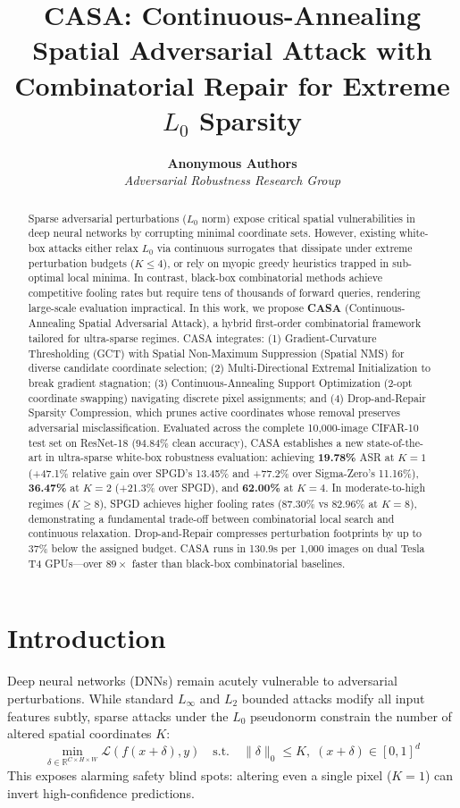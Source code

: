 \documentclass[10pt,twocolumn,letterpaper]{article}
\title{\textbf{\Large CASA: Continuous-Annealing Spatial Adversarial Attack with Combinatorial Repair for Extreme $L_0$ Sparsity}}
\author{
  \textbf{Anonymous Authors} \\
  \textit{Adversarial Robustness Research Group}
}
\date{}
\begin{document}
\maketitle

\begin{abstract}
Sparse adversarial perturbations ($L_0$ norm) expose critical spatial vulnerabilities in deep neural networks by corrupting minimal coordinate sets. However, existing white-box attacks either relax $L_0$ via continuous surrogates that dissipate under extreme perturbation budgets ($K \le 4$), or rely on myopic greedy heuristics trapped in sub-optimal local minima. In contrast, black-box combinatorial methods achieve competitive fooling rates but require tens of thousands of forward queries, rendering large-scale evaluation impractical.
In this work, we propose \textbf{CASA} (Continuous-Annealing Spatial Adversarial Attack), a hybrid first-order combinatorial framework tailored for ultra-sparse regimes. CASA integrates: (1) Gradient-Curvature Thresholding (GCT) with Spatial Non-Maximum Suppression (Spatial NMS) for diverse candidate coordinate selection; (2) Multi-Directional Extremal Initialization to break gradient stagnation; (3) Continuous-Annealing Support Optimization (2-opt coordinate swapping) navigating discrete pixel assignments; and (4) Drop-and-Repair Sparsity Compression, which prunes active coordinates whose removal preserves adversarial misclassification.
Evaluated across the complete 10,000-image CIFAR-10 test set on ResNet-18 ($94.84\%$ clean accuracy), CASA establishes a new state-of-the-art in ultra-sparse white-box robustness evaluation: achieving \textbf{19.78\%} ASR at $K=1$ (+47.1\% relative gain over SPGD's 13.45\% and +77.2\% over Sigma-Zero's 11.16\%), \textbf{36.47\%} at $K=2$ (+21.3\% over SPGD), and \textbf{62.00\%} at $K=4$. In moderate-to-high regimes ($K \ge 8$), SPGD achieves higher fooling rates ($87.30\%$ vs $82.96\%$ at $K=8$), demonstrating a fundamental trade-off between combinatorial local search and continuous relaxation. Drop-and-Repair compresses perturbation footprints by up to 37\% below the assigned budget. CASA runs in 130.9s per 1,000 images on dual Tesla T4 GPUs---over $89\times$ faster than black-box combinatorial baselines.
\end{abstract}

\section{Introduction}
Deep neural networks (DNNs) remain acutely vulnerable to adversarial perturbations. While standard $L_\infty$ and $L_2$ bounded attacks modify all input features subtly, sparse attacks under the $L_0$ pseudonorm constrain the number of altered spatial coordinates $K$:
\begin{equation}
\min_{\delta \in \mathbb{R}^{C \times H \times W}} \mathcal{L}(f(x + \delta), y) \quad \text{s.t.} \quad \|\delta\|_0 \le K, \; (x + \delta) \in [0, 1]^d
\end{equation}
This exposes alarming safety blind spots: altering even a single pixel ($K=1$) can invert high-confidence predictions.
\end{document}
